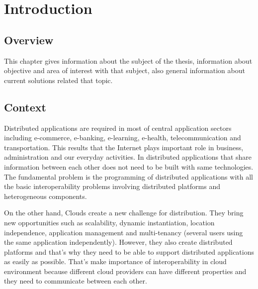 
\chapter{Introduction}
\label{chapter:introduction}
\section{Overview}
\label{section:overview}
This chapter gives information about the subject of the thesis, information about objective and area of interest with that subject, also general information about current solutions related that topic.

\section{Context}
\label{section:context}

Distributed applications are required in most of central application sectors including e-commerce, e-banking, e-learning, e-health, telecommunication and transportation\citep{thesis:introduction1}. This results that the Internet plays important role in business, administration and our everyday activities. In distributed applications that share information between each other does not need to be built with same technologies. The fundamental problem is the programming of distributed applications with all the basic interoperability problems involving distributed platforms and heterogeneous components.

On the other hand, Clouds create a new challenge for distribution. They bring new opportunities such as scalability, dynamic instantiation, location independence, application management and multi-tenancy (several users using the same application independently)\citep{thesis:introduction2}. However, they also create distributed platforms and that’s why they need to be able to support distributed applications as easily as possible. That's make importance of interoperability in cloud environment because different cloud providers can have different properties and they need to communicate between each other.


